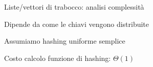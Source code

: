 \begin{frame}{Liste/vettori di trabocco: analisi complessità}

\vspace{-6pt}
\BIL
\item Dipende da come le chiavi vengono distribuite
\item Assumiamo hashing uniforme semplice
\item Costo calcolo funzione di hashing: $\Theta(1)$
\EIL

\pause
{}

\end{frame}

